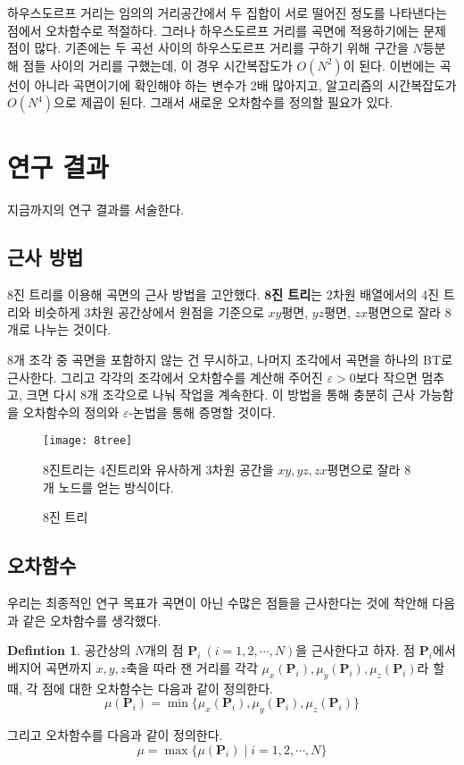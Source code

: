 \documentclass[10pt]{gshs-report-v2.0}
\theoremstyle{theorem}
\theoremstyle{lemma}
\theoremstyle{definition}
\newtheorem{definition}[theorem]{Defintion}
\begin{document}
하우스도르프 거리는 임의의 거리공간에서 두 집합이 서로 떨어진 정도를 나타낸다는 점에서 오차함수로 적절하다.\cite{last year} 그러나 하우스도르프 거리를 곡면에 적용하기에는 문제점이 많다. 기존에는 두 곡선 사이의 하우스도르프 거리를 구하기 위해 구간을 $N$등분해 점들 사이의 거리를 구했는데, 이 경우 시간복잡도가 $O(N^2)$이 된다. 이번에는 곡선이 아니라 곡면이기에 확인해야 하는 변수가 2배 많아지고, 알고리즘의 시간복잡도가 $O(N^4)$으로 제곱이 된다. 그래서 새로운 오차함수를 정의할 필요가 있다. 

\section{연구 결과}
지금까지의 연구 결과를 서술한다.

\subsection{근사 방법}
8진 트리를 이용해 곡면의 근사 방법을 고안했다. \textbf{8진 트리}는 2차원 배열에서의 4진 트리와 비슷하게 3차원 공간상에서 원점을 기준으로 $xy$평면, $yz$평면, $zx$평면으로 잘라 8개로 나누는 것이다. 

8개 조각 중 곡면을 포함하지 않는 건 무시하고, 나머지 조각에서 곡면을 하나의 BT로 근사한다. 그리고 각각의 조각에서 오차함수를 계산해 주어진 $\varepsilon>0$보다 작으면 멈추고, 크면 다시 8개 조각으로 나눠 작업을 계속한다. 이 방법을 통해 충분히 근사 가능함을 오차함수의 정의와 $\varepsilon$-논법을 통해 증명할 것이다. 

\begin{figure}[h]
	\centering
	\texttt{[image: 8tree]}
	\caption{8진 트리}
	\small 8진트리는 4진트리와 유사하게 3차원 공간을 $xy, yz, zx$평면으로 잘라 8개 노드를 얻는 방식이다. 
\end{figure}

\subsection{오차함수}
우리는 최종적인 연구 목표가 곡면이 아닌 수많은 점들을 근사한다는 것에 착안해 다음과 같은 오차함수를 생각했다. 
\begin{definition} \label{error function}
	공간상의 $N$개의 점 $\mathbf{P}_i\ (i=1, 2, \cdots, N)$을 근사한다고 하자. 점 $\mathbf{P}_i$에서 베지어 곡면까지 $x, y, z$축을 따라 잰 거리를 각각 $\mu_x(\mathbf{P}_i), \mu_y(\mathbf{P}_i), \mu_z(\mathbf{P}_i)$라 할때, 각 점에 대한 오차함수는 다음과 같이 정의한다.
	\begin{equation*}
		\mu(\mathbf{P}_i)=\min\{\mu_x(\mathbf{P}_i), \mu_y(\mathbf{P}_i), \mu_z(\mathbf{P}_i)\}
	\end{equation*}
	
	그리고 오차함수를 다음과 같이 정의한다.
	\begin{equation*}
		\mu=\max\{\mu(\mathbf{P}_i)\mid i=1, 2, \cdots, N\}
	\end{equation*}
\end{definition}
\end{document}
